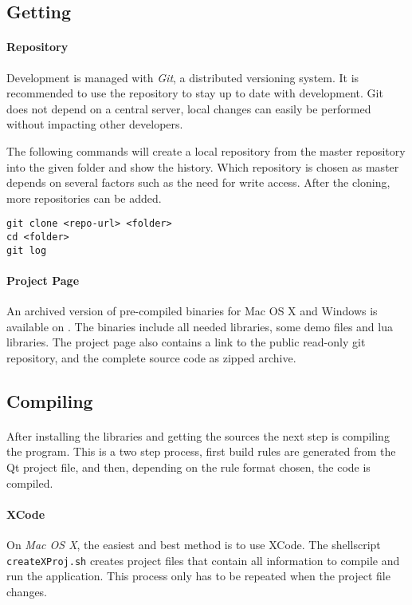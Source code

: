 \subsection{Getting \ER}
\paragraph{Repository}
Development is managed with \textit{Git}\cite{git}, a distributed versioning system.
It is recommended to use the repository to stay up to date with development.
Git does not depend on a central server, local changes can easily be performed without impacting other developers.

The following commands will create a local repository from the master repository into the given folder and show the history.
Which repository is chosen as master depends on several factors such as the need for write access.
After the cloning, more repositories can be added.

\begin{verbatim}
git clone <repo-url> <folder>
cd <folder>
git log
\end{verbatim}

\paragraph{Project Page}
An archived version of pre-compiled binaries for Mac OS X and Windows is available on \cite{project}.
The binaries include all needed libraries, some demo files and lua libraries.
The project page also contains a link to the public read-only git repository, and the complete source code as zipped archive.


\subsection{Compiling}
\paragraph{}
After installing the libraries and getting the sources the next step is compiling the program.
This is a two step process, first build rules are generated from the Qt project file, and then, depending on the rule format chosen, the code is compiled.

\paragraph{XCode}
On \textit{Mac OS X}, the easiest and best method is to use XCode.
The shellscript \texttt{createXProj.sh} creates project files that contain all information to compile and run the application.
This process only has to be repeated when the project file changes.

